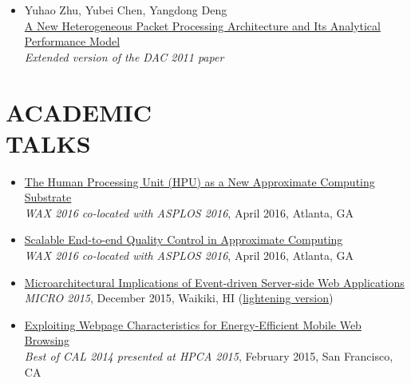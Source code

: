 \documentclass[margin, 9pt]{res} %
\begin{document}
\begin{resume}
\begin{itemize}[leftmargin=*]
	\item Yuhao Zhu, Yubei Chen, Yangdong Deng\\
          \href{http://yuhaozhu.com/pubs/tr12.pdf}{A New Heterogeneous Packet Processing Architecture and Its Analytical Performance Model}\\
          \textit{Extended version of the DAC 2011 paper}
\end{itemize}

 
\section{ACADEMIC\\ TALKS}

\vspace*{-2pt}
\begin{itemize}[leftmargin=*] \itemsep 0pt
	\item \href{https://speakerdeck.com/queeten/the-human-processing-unit-hpu-as-a-new-approximate-computing-substrate}{The Human Processing Unit (HPU) as a New Approximate Computing Substrate}\\[2pt]
          \textit{WAX 2016 co-located with ASPLOS 2016}, April 2016, Atlanta, GA

	\item \href{https://speakerdeck.com/queeten/end-to-end-quality-control-in-approximate-computing}{Scalable End-to-end Quality Control in Approximate Computing}\\[2pt]
          \textit{WAX 2016 co-located with ASPLOS 2016}, April 2016, Atlanta, GA

	\item \href{https://speakerdeck.com/queeten/microarchitectural-implications-of-event-driven-server-side-web-applications}{Microarchitectural Implications of Event-driven Server-side Web Applications}\\[2pt]
          \textit{MICRO 2015}, December 2015, Waikiki, HI (\href{https://speakerdeck.com/queeten/micro-2015-lightning-session-talk}{lightening version})

	\item \href{https://speakerdeck.com/queeten/exploiting-webpage-characteristics-for-energy-efficient-mobile-web-browsing}{Exploiting Webpage Characteristics for Energy-Efficient Mobile Web Browsing}\\[2pt]
          \textit{Best of CAL 2014 presented at HPCA 2015}, February 2015, San Francisco, CA


\end{itemize}
\end{resume}
\end{document}

